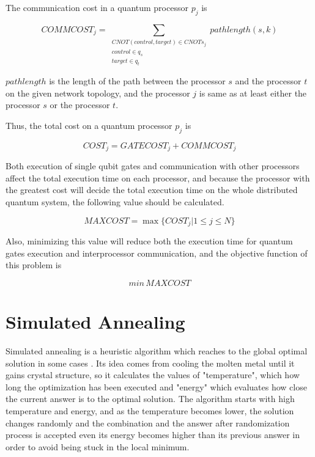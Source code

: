 The communication cost in a quantum processor $p_j$ is 

 \begin{equation}
COMMCOST_j = \sum_{ \substack{CNOT (control, target) \in CNOTs_{j} \\ control \in q_s \\ target \in q_t}} pathlength(s, k)
 \end{equation}
 
 
$pathlength$ is the length of the path between the processor $s$ and the processor $t$ on the given network topology, and the processor $j$ is same as at least either the processor $s$ or the processor $t$.

Thus, the total cost on a quantum processor $p_j$ is 

 \begin{equation}
COST_j = GATECOST_j + COMMCOST_j
 \end{equation}

Both execution of single qubit gates and communication with other processors affect the total execution time on each processor, and because the processor with the greatest cost will decide the total execution time on the whole distributed quantum system, the following value should be calculated.

 \begin{equation}
MAXCOST = \max \{COST_j | 1 \leq j \leq N\}
 \end{equation}

Also, minimizing this value will reduce both the execution time for quantum gates execution and interprocessor communication, and the objective function of this problem is 

 \begin{equation}
 min\,MAXCOST
  \end{equation}

\newpage

\section{Simulated Annealing}
Simulated annealing is a heuristic algorithm which reaches to the global optimal solution in some cases \cite{simulatedannealing, Boltzmann}. Its idea comes from cooling the molten metal until it gains crystal structure, so it calculates the values of "temperature", which how long the optimization has been executed and "energy" which evaluates how close the current answer is to the optimal solution.  The algorithm starts with high temperature and energy, and as the temperature becomes lower,  the solution changes randomly and the combination and the answer after randomization process is accepted even its energy becomes higher than its previous answer in order to avoid being stuck in the local minimum.

